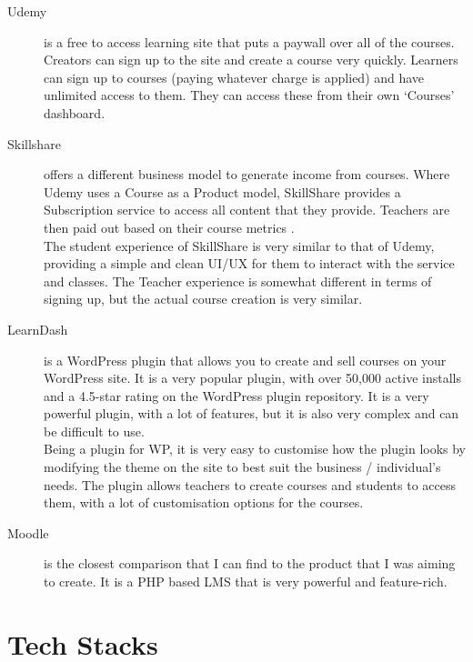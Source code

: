 \documentclass[12pt, a4paper,twoside]{report}
\theoremstyle{plain} %
\theoremstyle{definition} %
\numberwithin{equation}{chapter}
\begin{document}
\begin{description}
    \item[Udemy] {
        is a free to access learning site that puts a paywall over all of
        the courses. Creators can sign up to the site and create a course very
        quickly. Learners can sign up to courses (paying whatever charge is
        applied) and have unlimited access to them. They can access these from
        their own `Courses' dashboard.
    }
    \item[Skillshare] {
        offers a different business model to generate income from
        courses. Where Udemy uses a Course as a Product model, SkillShare
        provides a Subscription service to access all content that they provide.
        Teachers are then paid out based on their course metrics
        \cite{skillshare-teacher-earnings}.\\
        The student experience of SkillShare is very similar to that of Udemy,
        providing a simple and clean UI/UX for them to interact with the service
        and classes. The Teacher experience is somewhat different in terms of
        signing up, but the actual course creation is very similar.
        \cite{skillshare-ux-1}\cite{skillshare-ux-2}
    }
    \item[LearnDash] {
        is a WordPress plugin that allows you to create and sell
        courses on your WordPress site. It is a very popular plugin, with
        over 50,000 active installs and a 4.5-star rating on the WordPress
        plugin repository. It is a very powerful plugin, with a lot of
        features, but it is also very complex and can be difficult to use.
        \cite{learndash}\\
        Being a plugin for WP, it is very easy to customise how the plugin
        looks by modifying the theme on the site to best suit the business /
        individual's needs. The plugin allows teachers to create courses and
        students to access them, with a lot of customisation options for the
        courses.
    }
    \item[Moodle] {
        is the closest comparison that I can find to the product that I was
        aiming to create. It is a PHP based LMS that is very powerful and
        feature-rich.
    }
\end{description}

\section{Tech Stacks}\label{sec:techstacks}
\end{document}
